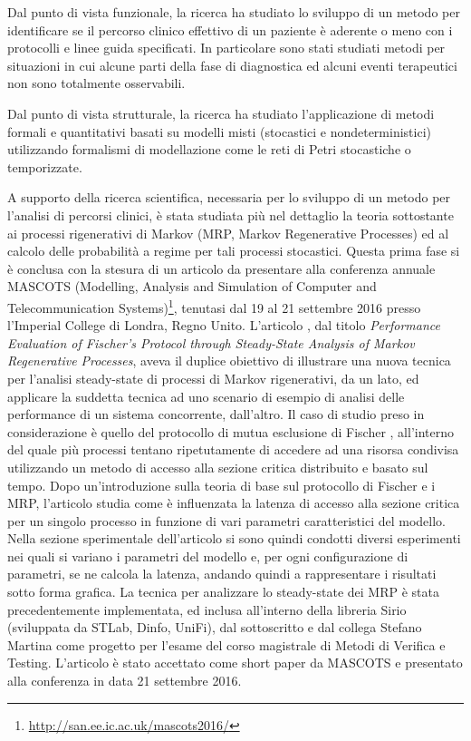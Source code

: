\documentclass{article}
\begin{document}
    Dal punto di vista funzionale, la ricerca ha studiato lo sviluppo di un metodo per identificare se il percorso clinico effettivo di un paziente è aderente o meno con i protocolli e linee guida specificati. In particolare sono stati studiati metodi per situazioni in cui alcune parti della fase di diagnostica ed alcuni eventi terapeutici non sono totalmente osservabili.
    
    Dal punto di vista strutturale, la ricerca ha studiato l'applicazione di metodi formali e quantitativi basati su modelli misti (stocastici e nondeterministici) utilizzando formalismi di modellazione come le reti di Petri stocastiche o temporizzate.
    
    A supporto della ricerca scientifica, necessaria per lo sviluppo di un metodo per l'analisi di percorsi clinici, è stata studiata più nel dettaglio la teoria sottostante ai processi rigenerativi di Markov (MRP, Markov Regenerative Processes) ed al calcolo delle probabilità a regime per tali processi stocastici. Questa prima fase si è conclusa con la stesura di un articolo da presentare alla conferenza annuale MASCOTS (Modelling, Analysis and Simulation of Computer and Telecommunication Systems)\footnote{\url{http://san.ee.ic.ac.uk/mascots2016/}}, tenutasi dal 19 al 21 settembre 2016 presso l'Imperial College di Londra, Regno Unito. L'articolo \cite{mascots16}, dal titolo \textit{Performance Evaluation of Fischer's Protocol through Steady-State Analysis of Markov Regenerative Processes}, aveva il duplice obiettivo di illustrare una nuova tecnica per l'analisi steady-state di processi di Markov rigenerativi, da un lato, ed applicare la suddetta tecnica ad uno scenario di esempio di analisi delle performance di un sistema concorrente, dall'altro. Il caso di studio preso in considerazione è quello del protocollo di mutua esclusione di Fischer \cite{fischer85}, all'interno del quale più processi tentano ripetutamente di accedere ad una risorsa condivisa utilizzando un metodo di accesso alla sezione critica distribuito e basato sul tempo. Dopo un'introduzione sulla teoria di base sul protocollo di Fischer e i MRP, l'articolo studia come è influenzata la latenza di accesso alla sezione critica per un singolo processo in funzione di vari parametri caratteristici del modello. Nella sezione sperimentale dell'articolo si sono quindi condotti diversi esperimenti nei quali si variano i parametri del modello e, per ogni configurazione di parametri, se ne calcola la latenza, andando quindi a rappresentare i risultati sotto forma grafica. La tecnica per analizzare lo steady-state dei MRP è stata precedentemente implementata, ed inclusa all'interno della libreria Sirio (sviluppata da STLab, Dinfo, UniFi), dal sottoscritto e dal collega Stefano Martina come progetto per l'esame del corso magistrale di Metodi di Verifica e Testing. L'articolo è stato accettato come short paper da MASCOTS e presentato alla conferenza in data 21 settembre 2016.
    
\end{document}
